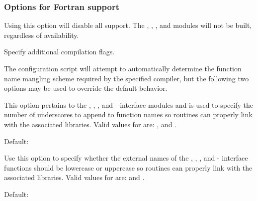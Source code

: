 
\subsubsection*{Options for Fortran support}

\begin{config}

\item {}

  Using this option will disable all {\F} support. The {\fcvode},
  {\fkinsol}, {\fida}, and {\fnvector} modules will not be built,
  regardless of availability.

\item {}

  Specify additional {\F} compilation flags.

\end{config}

\noindent The configuration script will attempt to automatically determine the
function name mangling scheme required by the specified {\F} compiler, but the
following two options may be used to override the default behavior.

\begin{config}

\item {}

  This option pertains to the {\fcvode}, {\fkinsol}, {\fida}, and {\fnvector}
  {\F}-{\C} interface modules and is used to specify the number of underscores to
  append to function names so {\F} routines can properly link with the associated
  {\sundials} libraries. Valid values for  are: , 
  and .

  Default: 

\item {}

  Use this option to specify whether the external names of the {\fcvode},
  {\fkinsol}, {\fida}, and {\fnvector} {\F}-{\C} interface functions should be
  lowercase or uppercase so {\F} routines can properly link with the associated
  {\sundials} libraries. Valid values for  are:  and .

  Default: 

\end{config}



